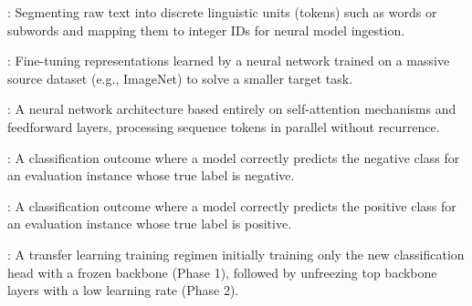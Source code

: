 \begin{description}[leftmargin=!,labelwidth=4.5cm,itemsep=1.5ex]
\item[\textbf{Tokenization}\hfill \textnormal{\sffamily\scriptsize\color{keyideablue}[NLP]}]: Segmenting raw text into discrete linguistic units (tokens) such as words or subwords and mapping them to integer IDs for neural model ingestion.
\item[\textbf{Transfer Learning}\hfill \textnormal{\sffamily\scriptsize\color{keyideablue}[Deep Learning]}]: Fine-tuning representations learned by a neural network trained on a massive source dataset (e.g., ImageNet) to solve a smaller target task.
\item[\textbf{Transformer}\hfill \textnormal{\sffamily\scriptsize\color{keyideablue}[Deep Learning]}]: A neural network architecture based entirely on self-attention mechanisms and feedforward layers, processing sequence tokens in parallel without recurrence.
\item[\textbf{True Negative (TN)}\hfill \textnormal{\sffamily\scriptsize\color{keyideablue}[Evaluation]}]: A classification outcome where a model correctly predicts the negative class for an evaluation instance whose true label is negative.
\item[\textbf{True Positive (TP)}\hfill \textnormal{\sffamily\scriptsize\color{keyideablue}[Evaluation]}]: A classification outcome where a model correctly predicts the positive class for an evaluation instance whose true label is positive.
\item[\textbf{Two-Phase Transfer Learning}\hfill \textnormal{\sffamily\scriptsize\color{keyideablue}[Deep Learning]}]: A transfer learning training regimen initially training only the new classification head with a frozen backbone (Phase 1), followed by unfreezing top backbone layers with a low learning rate (Phase 2).
\end{description}

